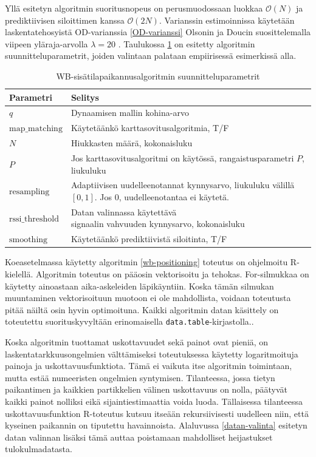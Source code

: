 \documentclass[
  12pt,
  a4paper, twoside]{book}
\begin{document}
Yllä esitetyn algoritmin suoritusnopeus on perusmuodossaan luokkaa \(\mathcal{O}(N)\) ja prediktiivisen siloittimen kanssa \(\mathcal{O}(2N)\). Varianssin estimoinnissa käytetään laskentatehosyistä OD-varianssia \ref{OD-varianssi} Olsonin ja Doucin suosittelemalla viipeen yläraja-arvolla \(\lambda=20\) \citep{olsson-2019}. Taulukossa \ref{tab:wb-parametrit} on esitetty algoritmin suunnitteluparametrit, joiden valintaan palataan empiirisessä esimerkissä alla.

\begin{table}

\caption{\label{tab:wb-parametrit}WB-sisätilapaikannusalgoritmin suunnitteluparametrit}
\centering
\begin{tabular}[t]{ll}
\toprule
Parametri & Selitys\\
\midrule
$q$ & Dynaamisen mallin kohina-arvo\\
$\text{map\_matching}$ & Käytetäänkö karttasovitusalgoritmia, T/F\\
$N$ & Hiukkasten määrä, kokonaisluku\\
$P$ & \makecell[l]{Jos karttasovitusalgoritmi on käytössä,\\ rangaistusparametri $P$, liukuluku}\\
$\text{resampling}$ & \makecell[l]{Adaptiivisen uudelleenotannat kynnysarvo,\\ liukuluku välillä $[0,1]$. Jos $0$, uudelleenotantaa ei käytetä.}\\
\addlinespace
$\text{rssi\_threshold}$ & \makecell[l]{Datan valinnassa käytettävä\\ signaalin vahvuuden kynnysarvo, kokonaisluku}\\
$\text{smoothing}$ & Käytetäänkö prediktiivistä siloitinta, T/F\\
\bottomrule
\end{tabular}
\end{table}

Koeasetelmassa käytetty algoritmin \ref{wb-positioning} toteutus on ohjelmoitu R-kielellä. Algoritmin toteutus on pääosin vektorisoitu ja tehokas. For-silmukkaa on käytetty ainoastaan aika-askeleiden läpikäyntiin. Koska tämän silmukan muuntaminen vektorisoituun muotoon ei ole mahdollista, voidaan toteutusta pitää näiltä osin hyvin optimoituna. Kaikki algoritmin datan käsittely on toteutettu suorituskyvyltään erinomaisella \texttt{data.table}-kirjastolla..

Koska algoritmin tuottamat uskottavuudet sekä painot ovat pieniä, on laskentatarkkuusongelmien välttämiseksi toteutuksessa käytetty logaritmoituja painoja ja uskottavuusfunktiota. Tämä ei vaikuta itse algoritmin toimintaan, mutta estää numeeristen ongelmien syntymisen. Tilanteessa, jossa tietyn paikantimen ja kaikkien partikkelien välinen uskottavuus on nolla, päätyvät kaikki painot nolliksi eikä sijaintiestimaattia voida luoda. Tällaisessa tilanteessa uskottavuusfunktion R-toteutus kutsuu itseään rekursiivisesti uudelleen niin, että kyseinen paikannin on tiputettu havainnoista. Alaluvussa \ref{datan-valinta} esitetyn datan valinnan lisäksi tämä auttaa poistamaan mahdolliset heijastukset tulokulmadatasta.
\end{document}
